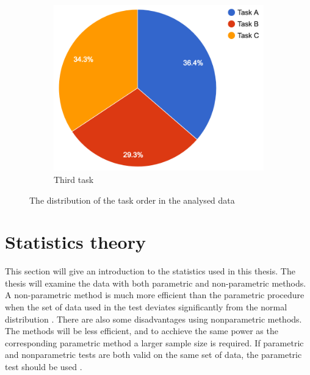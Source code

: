 \begin{figure}[H]
\begin{subfigure}[b]{0.32\textwidth}
		\includegraphics[width=\linewidth]{fig/thirdtask}
		\caption{Third task}
		\label{fig:thirdtask}
	\end{subfigure}
	\caption{The distribution of the task order in the analysed data}
	\label{fig:taskorderdistribution}
\end{figure}


\section{Statistics theory}\label{sec:statistic_theory}
This section will give an introduction to the statistics used in this thesis. The thesis will examine the data with both parametric and non-parametric methods. A non-parametric method is much more efficient than the parametric procedure when the set of data used in the test deviates significantly from the normal distribution \citep{Walpole2012}. There are also some disadvantages using nonparametric methods. The methods will be less efficient, and to acchieve the same power as the corresponding parametric method a larger sample size is required. If parametric and nonparametric tests are both valid on the same set of data, the parametric test should be used \citep{Walpole2012}. 

